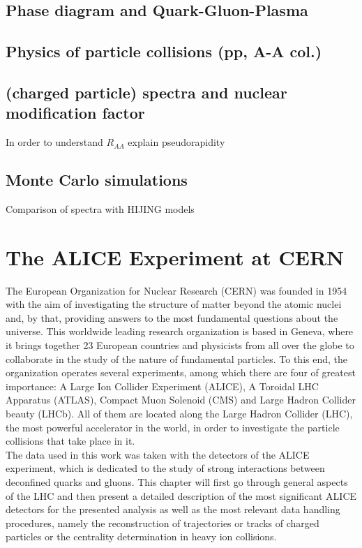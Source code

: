 \documentclass[12pt,a4paper]{report}
\begin{document}
\section{Phase diagram and Quark-Gluon-Plasma}
\section{Physics of particle collisions (pp, A-A col.)}
\section{(charged particle) \pt spectra and nuclear modification factor}
In order to understand $R_{AA}$ 
explain pseudorapidity
\section{Monte Carlo simulations}
Comparison of spectra with HIJING models

\chapter{The ALICE Experiment at CERN}
The European Organization for Nuclear Research (CERN) was founded in 1954 with the aim of investigating the structure of matter beyond the atomic nuclei and, by that, providing answers to the most fundamental questions about the universe. This worldwide leading research organization is based in Geneva, where it brings together 23 European countries and physicists from all over the globe to collaborate in the study of the nature of fundamental particles. To this end, the organization operates several experiments, among which there are four of greatest importance: A Large Ion Collider Experiment (ALICE), A Toroidal LHC Apparatus (ATLAS), Compact Muon Solenoid (CMS) and Large Hadron Collider beauty (LHCb). All of them are located along the Large Hadron Collider (LHC), the most powerful accelerator in the world, in order to investigate the particle collisions that take place in it. \\
The data used in this work was taken with the detectors of the ALICE experiment, which is dedicated to the study of strong interactions between deconfined quarks and gluons. This chapter will first go through general aspects of the LHC and then present a detailed description of the most significant ALICE detectors for the presented analysis as well as the most relevant data handling procedures, namely the reconstruction of trajectories or tracks of charged particles or the centrality determination in heavy ion collisions. 
\end{document}
